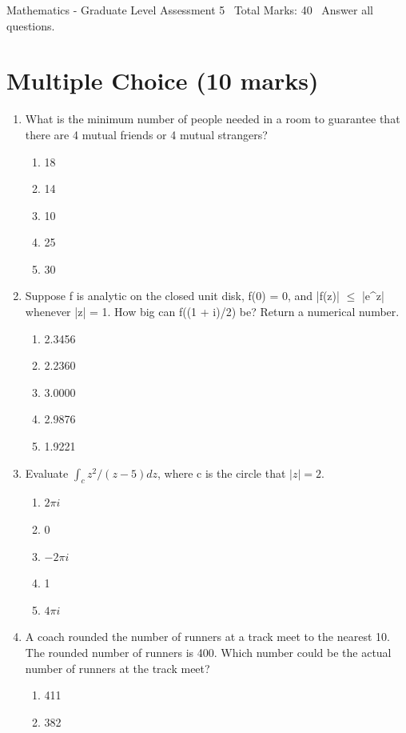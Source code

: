 \documentclass[12pt]{article}
\begin{document}
\begin{center}
Mathematics - Graduate Level Assessment 5 \
Total Marks: 40 \
Answer all questions.
\end{center}

\section*{Multiple Choice (10 marks)}
\begin{enumerate}[label=\arabic*.]
\item What is the minimum number of people needed in a room to guarantee that there are 4 mutual
friends or 4 mutual strangers?
\begin{enumerate}[label=(\alph*)]
    \item 18
    \item 14
    \item 10
    \item 25
    \item 30
\end{enumerate}
\item Suppose f is analytic on the closed unit disk, f(0) = 0, and |f(z)| $\leq$ |e\^{}z| whenever
|z| = 1. How big can f((1 + i)/2) be? Return a numerical number.
\begin{enumerate}[label=(\alph*)]
    \item 2.3456
    \item 2.2360
    \item 3.0000
    \item 2.9876
    \item 1.9221
\end{enumerate}
\item Evaluate $\int_c z^2 / (z - 5) dz$, where c is the circle that $|z| = 2$.
\begin{enumerate}[label=(\alph*)]
    \item $2\pi i$
    \item 0
    \item $-2\pi i$
    \item 1
    \item $4\pi i$
\end{enumerate}
\item A coach rounded the number of runners at a track meet to the nearest 10. The rounded
number of runners is 400. Which number could be the actual number of runners at the track
meet?
\begin{enumerate}[label=(\alph*)]
    \item 411
    \item 382

\end{enumerate}
\end{enumerate}
\end{document}
